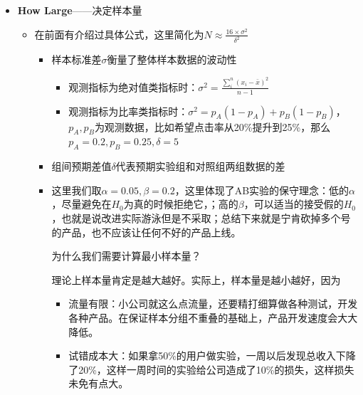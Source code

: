 \documentclass[
  letterpaper,
  DIV=11,
  numbers=noendperiod]{scrreprt}
\begin{document}
\begin{itemize}
\item
  \textbf{How Large}------决定样本量

  \begin{itemize}
  \item
    在前面有介绍过具体公式，这里简化为\(N  \approx \frac{16 \times \sigma^2}{\delta^2}\)

    \begin{itemize}
    \item
      样本标准差\(\sigma\)衡量了整体样本数据的波动性

      \begin{itemize}
      \item
        观测指标为绝对值类指标时：\(\sigma^2 = \frac{\sum_i^n(x_i-\bar{x})^2}{n-1}\)
      \item
        观测指标为比率类指标时：\(\sigma^2 = p_A(1-p_A)+p_B(1-p_B)\)，\(p_A,p_B\)为观测数据，比如希望点击率从20\%提升到25\%，那么\(p_A=0.2,p_B=0.25,\delta = 5%
        \)
      \end{itemize}
    \item
      组间预期差值\(\delta\)代表预期实验组和对照组两组数据的差
    \item
      这里我们取\(\alpha = 0.05,\beta=0.2\)，这里体现了AB实验的保守理念：低的\(\alpha\)，尽量避免在\(H_0\)为真的时候拒绝它，；高的\(\beta\)，可以适当的接受假的\(H_0\)，也就是说改进实际游泳但是不采取；总结下来就是宁肯砍掉多个号的产品，也不应该让任何不好的产品上线。

      \begin{tcolorbox}[enhanced jigsaw, colback=white, arc=.35mm, toptitle=1mm, title=\textcolor{quarto-callout-note-color}{\faInfo}\hspace{0.5em}{Note}, colframe=quarto-callout-note-color-frame, coltitle=black, colbacktitle=quarto-callout-note-color!10!white, left=2mm, rightrule=.15mm, opacityback=0, titlerule=0mm, bottomrule=.15mm, toprule=.15mm, leftrule=.75mm, bottomtitle=1mm, breakable, opacitybacktitle=0.6]

      为什么我们需要计算最小样本量？

      理论上样本量肯定是越大越好。实际上，样本量是越小越好，因为

      \begin{itemize}
      \item
        流量有限：小公司就这么点流量，还要精打细算做各种测试，开发各种产品。在保证样本分组不重叠的基础上，产品开发速度会大大降低。
      \item
        试错成本大：如果拿50\%的用户做实验，一周以后发现总收入下降了20\%，这样一周时间的实验给公司造成了10\%的损失，这样损失未免有点大。
      \end{itemize}


\end{tcolorbox}
\end{itemize}
\end{itemize}
\end{itemize}
\end{document}

